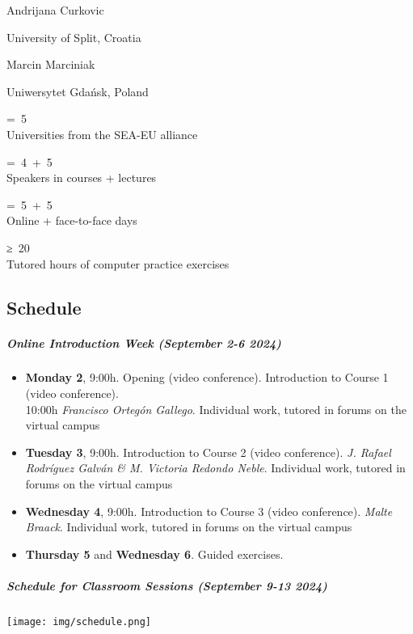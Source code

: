 \documentclass[
]{article}
\begin{document}
Andrijana Curkovic

University of Split, Croatia


Marcin Marciniak

Uniwersytet Gdańsk, Poland

{=~5}\\
Universities from the SEA-EU alliance

{=~4~+~5}\\
Speakers in courses + lectures

{=~5~+~5}\\
Online + face-to-face days

{≥~20}\\
Tutored hours of computer practice exercises

\hypertarget{schedule}{%
\subsection{Schedule}\label{schedule}}

\hypertarget{schedule-for-online-introduction}{%
\subparagraph{Online Introduction Week (September 2-6
2024)}\label{schedule-for-online-introduction}}

\begin{itemize}
\item
  \textbf{Monday 2}, 9:00h. Opening (video conference). Introduction to
  Course 1 (video conference).\\
  10:00h \emph{Francisco Ortegón Gallego}. Individual work, tutored in
  forums on the virtual campus
\item
  \textbf{Tuesday 3}, 9:00h. Introduction to Course 2 (video
  conference). \emph{J. Rafael Rodríguez Galván \& M. Victoria Redondo
  Neble}. Individual work, tutored in forums on the virtual campus
\item
  \textbf{Wednesday 4}, 9:00h. Introduction to Course 3 (video
  conference). \emph{Malte Braack}. Individual work, tutored in forums
  on the virtual campus
\item
  \textbf{Thursday 5} and \textbf{Wednesday 6}. Guided exercises.
\end{itemize}

\hypertarget{schedule-for-classroom-sessions}{%
\subparagraph{Schedule for Classroom Sessions (September 9-13
2024)}\label{schedule-for-classroom-sessions}}

\texttt{[image: img/schedule.png]}
\end{document}
